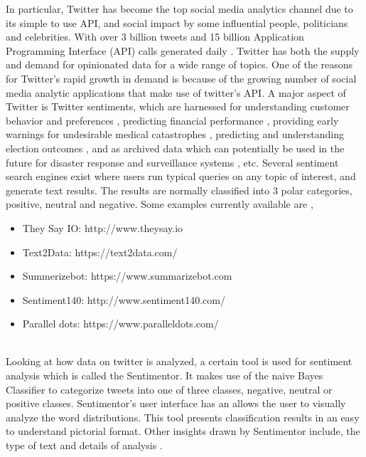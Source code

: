 In particular, Twitter has become the top social media analytics channel due to its simple to use API, and social impact by some influential people, politicians and celebrities. With over 3 billion tweets and 15 billion Application Programming Interface (API) calls generated daily \cite{ref8}. Twitter has both the supply and demand for opinionated data for a wide range of topics. One of the reasons for Twitter's rapid growth in demand is because of the growing number of social media analytic applications  that make use of twitter's API. A major aspect of Twitter is Twitter sentiments, which are harnessed for understanding customer behavior and preferences \cite{ref11}, predicting financial performance \cite{ref9}, providing early warnings for undesirable medical catastrophes \cite{ref10}, predicting and understanding election outcomes \cite{ref12}, and as archived data which can potentially be used in the future for disaster response and surveillance systems \cite{ref13}, etc. Several sentiment search engines exist where users run typical queries on any topic of interest, and generate text results. The results are normally classified into 3 polar categories, positive, neutral and negative. Some examples currently available are \cite{ref14},

\begin{itemize}

\item They Say IO:  http://www.theysay.io
\item Text2Data:  https://text2data.com/
\item Summerizebot:  https://www.summarizebot.com
\item Sentiment140: http://www.sentiment140.com/
\item Parallel dots: https://www.paralleldots.com/

\end{itemize}
\leavevmode\\
Looking at how data on twitter is analyzed, a certain tool is used for sentiment analysis which is called the Sentimentor. It makes use of the naive Bayes Classifier to categorize tweets into one of three classes, negative, neutral or positive classes. Sentimentor's user interface has an allows the user to visually analyze the word distributions. This tool presents classification results in an easy to understand pictorial format. Other insights drawn by Sentimentor include, the type of text and details of analysis \cite{ref15}.

